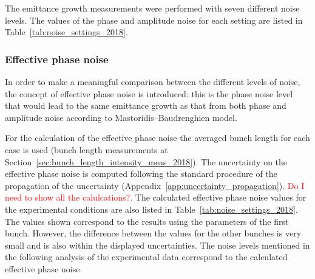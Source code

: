 The emittance growth measurements were performed with seven different noise levels. The values of the phase and amplitude noise for each setting are listed in Table~\ref{tab:noise_settings_2018}. 

\subsubsection*{Effective phase noise}
In order to make a meaningful comparison between the different levels of noise, the concept of effective phase noise is introduced: this is the phase noise level that would lead to the same emittance growth as that from both phase and amplitude noise according to Mastoridis--Baudrenghien model.

For the calculation of the effective phase noise the averaged bunch length for each case is used (bunch length measurements at Section~\ref{sec:bunch_length_intensity_meas_2018}). The uncertainty on the effective phase noise is computed following the standard procedure of the propagation of the uncertainty (Appendix~\ref{app:uncertainty_propagation}). \textcolor{red}{Do I need to show all the calulcations?.} The calculated effective phase noise values for the experimental conditions are also listed in Table~\ref{tab:noise_settings_2018}. The values shown correspond to the results using the parameters of the first bunch. However, the difference between the values for the other bunches is very small and is also within the displayed uncertainties. The noise levels mentioned in the following analysis of the experimental data correspond to the calculated effective phase noise. 

